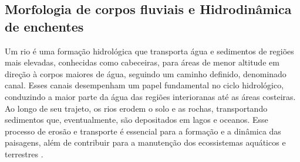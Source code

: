 \subsection{Morfologia de corpos fluviais e Hidrodinâmica de enchentes}
\label{morf}












Um rio é uma formação hidrológica que transporta água e sedimentos de regiões mais elevadas, conhecidas como cabeceiras,
para áreas de menor altitude em direção à corpos maiores de água, seguindo um caminho definido, denominado canal. Esses
canais desempenham um papel fundamental no ciclo hidrológico, conduzindo a maior parte da água das regiões interioranas
até as áreas costeiras. Ao longo de seu trajeto, os rios erodem o solo e as rochas, transportando sedimentos que,
eventualmente, são depositados em lagos e oceanos. Esse processo de erosão e transporte é essencial para a formação e a
dinâmica das paisagens, além de contribuir para a manutenção dos ecossistemas aquáticos e terrestres \cite{holden}.

